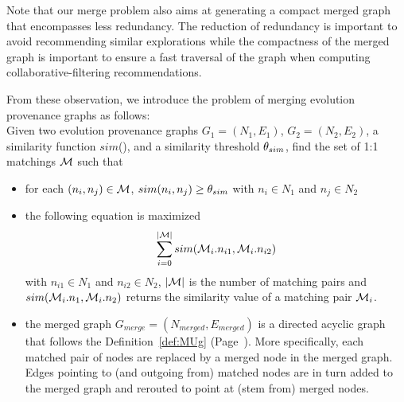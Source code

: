 Note that our merge problem also aims at generating a compact merged graph that encompasses less redundancy. The reduction of redundancy is important to avoid recommending similar explorations while the compactness of the merged graph is important to ensure a fast traversal of the graph when computing collaborative-filtering recommendations.

From these observation, we introduce the problem of merging evolution provenance graphs as follows:\\
Given two evolution provenance graphs $G_1=(N_1,E_1)$, $G_{2}=(N_{2},E_{2})$, a similarity function $sim$(), and a similarity threshold $\theta_{sim}$,  find the set of 1:1 matchings ${\mathcal M}$ such that


\begin{itemize}
\item  for each $(n_i, n_j) \in {\mathcal M}$, $sim(n_i, n_j) \geq \theta_{sim}$  with $n_i \in N_1$ and $n_j \in N_2$
\item the following equation is maximized
 \begin {equation}
 \sum^{|{\mathcal M}|}_{i=0}  sim({\mathcal M}_i.n_{i1},{\mathcal M}_i.n_{i2})
 \end{equation}
with $n_{i1} \in N_1$ and $n_{i2} \in N_2$, $|{\mathcal M}|$ is the number of matching pairs and $sim({\mathcal M}_i.n_1,{\mathcal M}_i.n_2)$ returns the similarity value of a matching pair ${\mathcal M}_i$.
\item the merged graph $G_{merge}=(N_{merged},E_{merged})$ is a directed acyclic graph that follows the Definition~\ref{def:MUg} (Page~\pageref{def:MUg}).  More specifically, each matched pair of nodes are replaced by a merged node in the merged graph.  Edges pointing  to (and outgoing from) matched nodes are in turn added to the merged graph and rerouted to point at (stem from) merged nodes.
\end{itemize}



